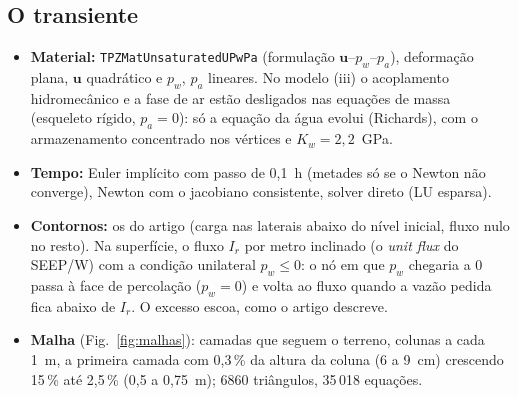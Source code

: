 \documentclass[11pt,a4paper]{article}
\begin{document}
\subsection{O transiente}
\begin{itemize}
  \item \textbf{Material:} \texttt{TPZMatUnsaturatedUPwPa} (formulação $\mathbf u$--$p_w$--$p_a$), deformação plana,
    $\mathbf u$ quadrático e $p_w$, $p_a$ lineares. No modelo (iii) o acoplamento hidromecânico e a fase de ar estão
    desligados nas equações de massa (esqueleto rígido, $p_a = 0$): só a equação da água evolui (Richards), com o
    armazenamento concentrado nos vértices e $K_w = 2{,}2$~GPa.
  \item \textbf{Tempo:} Euler implícito com passo de 0,1~h (metades só se o Newton não converge), Newton com o
    jacobiano consistente, solver direto (LU esparsa).
  \item \textbf{Contornos:} os do artigo (carga nas laterais abaixo do nível inicial, fluxo nulo no resto). Na
    superfície, o fluxo $I_r$ por metro inclinado (o \emph{unit flux} do SEEP/W) com a condição unilateral $p_w \le 0$:
    o nó em que $p_w$ chegaria a 0 passa à face de percolação ($p_w = 0$) e volta ao fluxo quando a vazão pedida fica
    abaixo de $I_r$. O excesso escoa, como o artigo descreve.
  \item \textbf{Malha} (Fig.~\ref{fig:malhas}): camadas que seguem o terreno, colunas a cada 1~m, a primeira camada com
    0,3\,\% da altura da coluna (6 a 9~cm) crescendo 15\,\% até 2,5\,\% (0,5 a 0,75~m); 6860 triângulos, 35\,018
    equações.
\end{itemize}
\end{document}
